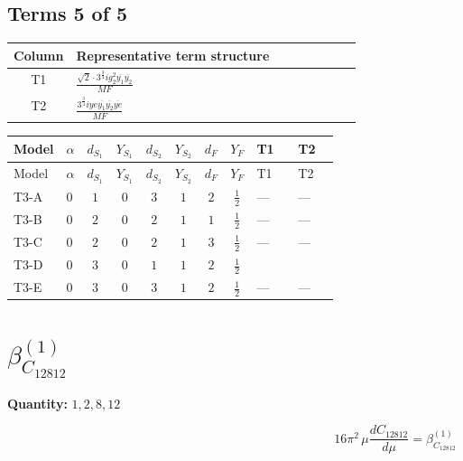 \documentclass[8pt]{article}
\begin{document}
\begin{landscape}
\subsection*{Terms 5 of 5}
\begin{center}
\begin{tabular}{@{}c >{\raggedright\arraybackslash}p{0.82\linewidth}@{}}
\toprule
Column & Representative term structure \\
\midrule
T1 & \(\displaystyle \frac{\sqrt{2} \cdot 3^{\frac{3}{4}} i g_{2}^{2} \overline{y_{1}} \overline{y_{2}}}{MF}\) \\
\midrule
T2 & \(\displaystyle \frac{3^{\frac{3}{4}} i ye \overline{y_{1}} \overline{y_{2}} \overline{ye}}{MF}\) \\
\midrule
\bottomrule
\end{tabular}
\end{center}
\smallskip
\tiny
\begin{longtable}{@{}llcccccc >{\raggedright\arraybackslash}p{0.21\linewidth} >{\raggedright\arraybackslash}p{0.21\linewidth}@{}}
\toprule
Model & $\alpha$ & $d_{S_1}$ & $Y_{S_1}$ & $d_{S_2}$ & $Y_{S_2}$ & $d_F$ & $Y_F$ & T1 & T2 \\
\midrule
\endfirsthead
\toprule
Model & $\alpha$ & $d_{S_1}$ & $Y_{S_1}$ & $d_{S_2}$ & $Y_{S_2}$ & $d_F$ & $Y_F$ & T1 & T2 \\
\midrule
\endhead
T3-A & $0$ & $1$ & $0$ & $3$ & $1$ & $2$ & $\frac{1}{2}$ & --- & --- \\
\midrule
T3-B & $0$ & $2$ & $0$ & $2$ & $1$ & $1$ & $\frac{1}{2}$ & --- & --- \\
\midrule
T3-C & $0$ & $2$ & $0$ & $2$ & $1$ & $3$ & $\frac{1}{2}$ & --- & --- \\
\midrule
T3-D & $0$ & $3$ & $0$ & $1$ & $1$ & $2$ & $\frac{1}{2}$ & \scriptsize\adjustbox{max width=\linewidth}{$\begin{gathered} - \frac{\sqrt{2} \cdot 3^{\frac{3}{4}} i g_{2}^{2} \overline{y_{1}} \overline{y_{2}}}{6 MF}\end{gathered}$} & \scriptsize\adjustbox{max width=\linewidth}{$\begin{gathered} \frac{3^{\frac{3}{4}} i ye \overline{y_{1}} \overline{y_{2}} \overline{ye}}{12 MF}\end{gathered}$} \\
\midrule
T3-E & $0$ & $3$ & $0$ & $3$ & $1$ & $2$ & $\frac{1}{2}$ & --- & --- \\
\midrule
\bottomrule
\end{longtable}
\clearpage
\section*{$\beta_{C_{12812}}^{(1)}$}
\noindent\textbf{Quantity: }$\mathrm{1,2,8,12}$\par\smallskip
\[16\pi^2\,\mu\frac{d C_{12812}}{d\mu}=\beta_{C_{12812}}^{(1)}\]

\end{landscape}
\end{document}
